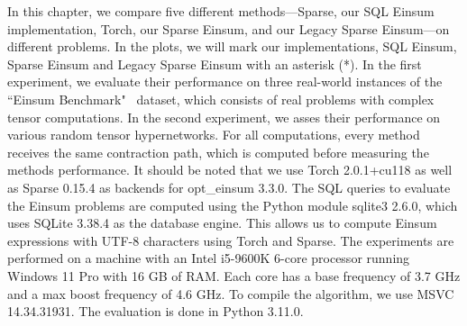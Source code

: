 
In this chapter, we compare five different methods—Sparse, our SQL Einsum implementation, Torch,
our Sparse Einsum, and our Legacy Sparse Einsum—on different problems. In the plots, we will mark
our implementations, SQL Einsum, Sparse Einsum and Legacy Sparse Einsum with an asterisk (*). In the
first experiment, we evaluate their performance on three real-world instances of the
``Einsum Benchmark"~\cite{einsum_benchmark} dataset, which consists of real problems with complex
tensor computations. In the second experiment, we asses their performance on various random tensor
hypernetworks. For all computations, every method receives the same contraction path, which is computed
before measuring the methods performance. It should be noted that we use Torch 2.0.1+cu118 as well
as Sparse 0.15.4 as backends for opt\_einsum 3.3.0. The SQL queries to evaluate the Einsum problems
are computed using the Python module sqlite3 2.6.0, which uses SQLite 3.38.4 as the database engine.
This allows us to compute Einsum expressions with UTF-8 characters using Torch and Sparse. The
experiments are performed on a machine with an Intel i5-9600K 6-core processor running Windows 11
Pro with 16 GB of RAM. Each core has a base frequency of 3.7 GHz and a max boost frequency of 4.6 GHz.
To compile the algorithm, we use MSVC 14.34.31931. The evaluation is done in Python 3.11.0.

